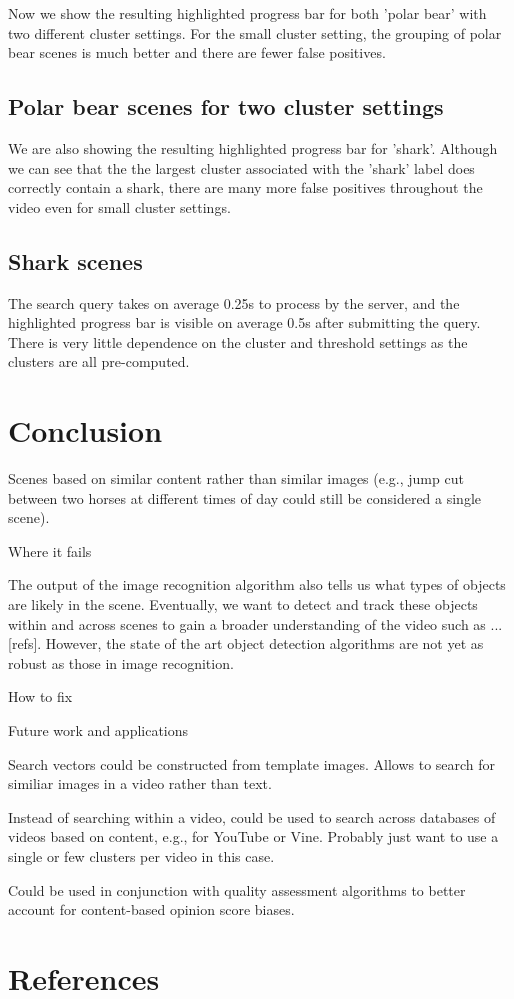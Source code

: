 \documentclass{article}
\begin{document}
Now we show the resulting highlighted progress bar for both 'polar bear' with two different cluster settings.
For the small cluster setting, the grouping of polar bear scenes is much better and there are fewer false positives.

\subsection{Polar bear scenes for two cluster settings}

We are also showing the resulting highlighted progress bar for 'shark'.
Although we can see that the the largest cluster associated with the 'shark' label does correctly contain a shark, there are many more false positives throughout the video even for small cluster settings.

\subsection{Shark scenes}

The search query takes on average 0.25s to process by the server, and the highlighted progress bar is visible on average 0.5s after submitting the query.
There is very little dependence on the cluster and threshold settings as the clusters are all pre-computed.

\section{Conclusion}


Scenes based on similar content rather than similar images
(e.g., jump cut between two horses at different times of day could
still be considered a single scene).


Where it fails

The output of the image recognition algorithm also tells us what types of objects are likely in the scene.
Eventually, we want to detect and track these objects within and across scenes to gain a broader understanding of the video such as ... [refs].
However, the state of the art object detection algorithms are not yet as robust as those in image recognition.


How to fix

Future work and applications

Search vectors could be constructed from template images. Allows to search
for similiar images in a video rather than text.

Instead of searching within a video, could be used to search across databases
of videos based on content, e.g., for YouTube or Vine. Probably just want to
use a single or few clusters per video in this case.

Could be used in conjunction with quality assessment algorithms to better
account for content-based opinion score biases.

\section{References}
\label{sec:ref}



\end{document}
